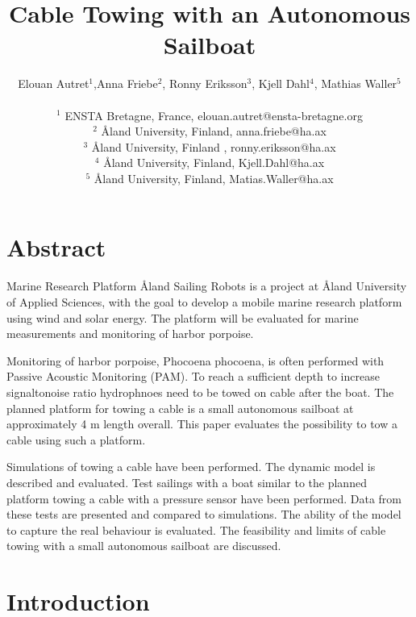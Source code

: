 \documentclass[11pt]{article} %
\title{ Cable Towing with an Autonomous Sailboat }
\author{Elouan Autret$^{1}$,Anna Friebe$^{2}$, Ronny Eriksson$^{3}$, Kjell Dahl$^{4}$, Mathias Waller$^{5}$\\
\\
\normalsize{$^{1}$ ENSTA Bretagne, France, elouan.autret@ensta-bretagne.org}\\
\normalsize{$^{2}$ Åland University, Finland, anna.friebe@ha.ax}\\
\normalsize{$^{3}$ Åland University, Finland , ronny.eriksson@ha.ax}\\
\normalsize{$^{4}$ Åland University, Finland, Kjell.Dahl@ha.ax}\\
\normalsize{$^{5}$ Åland University, Finland, Matias.Waller@ha.ax}\\
}
\date{}
\begin{document}
\maketitle

\renewcommand{\contentsname}{Contents}	%
\renewcommand{\bibname}{Bibliography}	%


\section*{Abstract}
Marine Research Platform \r{A}land Sailing Robots is a project at \r{A}land University of Applied  Sciences, with the goal to develop a mobile marine research platform using wind and solar energy. The platform will be evaluated for marine measurements and monitoring of harbor porpoise.

Monitoring of harbor porpoise, Phocoena phocoena, is often performed with Passive Acoustic Monitoring (PAM). To reach a sufficient depth to increase signaltonoise ratio hydrophnoes need to be towed on cable after the boat. The planned platform for towing a cable is a small autonomous sailboat at approximately 4 m length overall. This paper evaluates the possibility to tow a cable using such a platform.
   
Simulations of towing a cable have been performed. The dynamic model is described and evaluated. Test sailings with a boat similar to the planned platform towing a cable with a pressure sensor have been performed. Data from these tests are presented and compared to simulations. The ability of the model to capture the real behaviour is evaluated. The feasibility and limits of cable towing with a small autonomous sailboat are discussed.
   



\section{Introduction}

\end{document}
